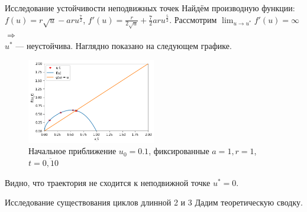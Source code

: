 \documentclass[11pt]{article}
\begin{document}
\begin{subsection}{Исследование устойчивости неподвижных точек}
	Найдём производную функции: \\
	$f(u) = r\sqrt{u} - ar u^{\frac{7}{2}} $, $f'(u) = \frac{r}{2\sqrt{u}} + \frac{7}{2}aru^{\frac{5}{2}}$. Рассмотрим $\lim_{u\to u^*} f'(u) = \infty $ $\Rightarrow$ \\  $u^*$ --- неустойчива. Наглядно показано на следующем графике.
	\begin{figure}[H]
\begin{center}
\includegraphics[width=0.5\textwidth]{graphic_3.png}
\caption{Начальное приближение $u_0 = 0.1$, фиксированные $a=1, r=1$, $t = \overline{0,10}$ }\label{pic_2}
\end{center}
\end{figure}
	Видно, что траектория не сходится к неподвижной точке $u^* = 0$.
	\end{subsection}
	\begin{subsection}{Исследование существования циклов длинной 2 и 3}
	Дадим теоретическую сводку.
	\end{subsection}
\end{document}
